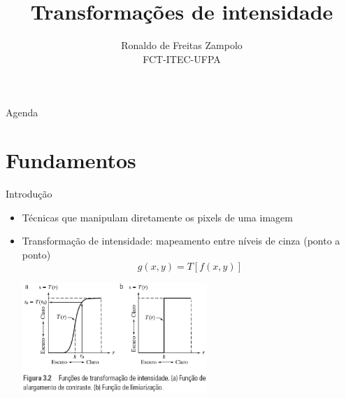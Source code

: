 


\title{\cursogrande\\ \vspace{1cm}Transformações de intensidade}
\author{Ronaldo de Freitas Zampolo\\FCT-ITEC-UFPA}


   \maketitle[randomdots={false}]
   \begin{slide}{Agenda}
      \tableofcontents[content=sections]
   \end{slide}

\section[ slide = true ]{Fundamentos}
      \begin{slide}[toc=]{Introdução}
         \begin{itemize}[type=1]
            \item Técnicas que manipulam diretamente os pixels de uma imagem
            \item Transformação de intensidade: mapeamento entre níveis de cinza (ponto a ponto)
            \begin{equation*}
               g(x,y) = T\left [ f(x,y)\right ]
            \end{equation*}
            \begin{center}
              \includegraphics[width=0.55\textwidth]{figs/fig0302}
           \end{center}
         \end{itemize}
      \end{slide}

